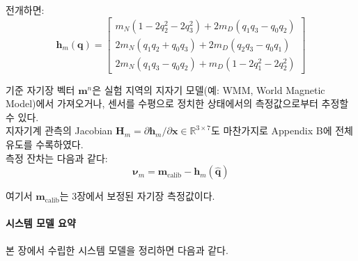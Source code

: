             전개하면:\\

            \begin{equation}
                \mathbf{h}_m(\mathbf{q}) = \begin{bmatrix}
                    m_N(1 - 2q_2^2 - 2q_3^2) + 2m_D(q_1 q_3 - q_0 q_2) \\
                    2m_N(q_1 q_2 + q_0 q_3) + 2m_D(q_2 q_3 - q_0 q_1) \\   %
                    2m_N(q_1 q_3 - q_0 q_2) + m_D(1 - 2q_1^2 - 2q_2^2)
                \end{bmatrix}
                \label{eq:mag_obs_expanded}
            \end{equation}

            기준 자기장 벡터 $\mathbf{m}^n$은 실험 지역의 지자기 모델(예: WMM, World Magnetic Model)에서 가져오거나, 센서를 수평으로 정치한 상태에서의 측정값으로부터 추정할 수 있다.\\

            지자기계 관측의 Jacobian $\mathbf{H}_m = \partial \mathbf{h}_m / \partial \mathbf{x} \in \mathbb{R}^{3\times 7}$도 마찬가지로 Appendix B에 전체 유도를 수록하였다.\\

            측정 잔차는 다음과 같다:\\

            \begin{equation}
                \boldsymbol{\nu}_m = \mathbf{m}_{\text{calib}} - \mathbf{h}_m(\hat{\mathbf{q}})
                \label{eq:mag_innovation}
            \end{equation}

            \noindent 여기서 $\mathbf{m}_{\text{calib}}$는 3장에서 보정된 자기장 측정값이다.\\

            \paragraph{시스템 모델 요약}
                본 장에서 수립한 시스템 모델을 정리하면 다음과 같다.\\

